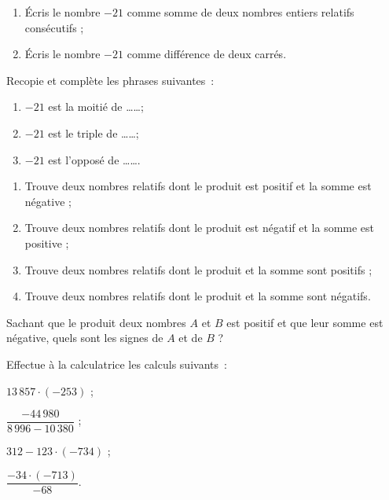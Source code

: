 \begin{exercice}[Le nombre $-21$...]
\begin{enumerate}
 \item Écris le nombre $-21$ comme somme de deux nombres entiers relatifs consécutifs ;
 \item Écris le nombre $-21$ comme différence de deux carrés.
 \end{enumerate}
\end{exercice}


\begin{exercice}
Recopie et complète les phrases suivantes :
\begin{enumerate}
 \item $-21$ est la moitié de \ldots \ldots ;
 \item $-21$ est le triple de \ldots \ldots ;
 \item $-21$ est l'opposé de \ldots \ldots.
 \end{enumerate}
\end{exercice}


\begin{exercice}
\begin{enumerate}
 \item Trouve deux nombres relatifs dont le produit est positif et la somme est négative ;
 \item Trouve deux nombres relatifs dont le produit est négatif et la somme est positive ;
 \item Trouve deux nombres relatifs dont le produit et la somme sont positifs ;
 \item Trouve deux nombres relatifs dont le produit et la somme sont négatifs.
 \end{enumerate}
\end{exercice}


\begin{exercice}[Énigme]
Sachant que le produit deux nombres $A$ et $B$ est positif et que leur somme est négative, quels sont les signes de $A$ et de $B$ ?
\end{exercice}


\begin{exercice}[Calculatrice]
Effectue à la calculatrice les calculs suivants :
\begin{colenumerate}{2}
 \item $13\,857 \cdot (-253)$ ;
 \item $\dfrac{-44\,980}{8\,996 - 10\,380}$ ;
 \item $312 - 123 \cdot (-734)$ ;
 \item $\dfrac{-34 \cdot (-713)}{-68}$.
 \end{colenumerate}
\end{exercice}


